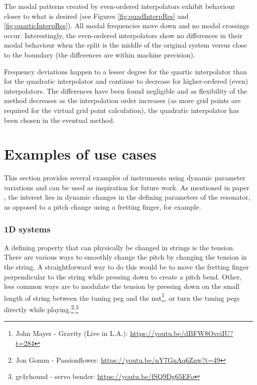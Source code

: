 The modal patterns created by even-ordered interpolators exhibit behaviour closer to what is desired (see Figures \ref{fig:quadInterpRes} and \ref{fig:quarticInterpRes}). All modal frequencies move down and no modal crossings occur. Interestingly, the even-ordered interpolators show no differences in their modal behaviour when the split is the middle of the original system versus close to the boundary (the differences are within machine precision).

Frequency deviations happen to a lesser degree for the quartic interpolator than for the quadratic interpolator and continue to decrease for higher-ordered (even) interpolators. The differences have been found negligible and as flexibility of the method decreases as the interpolation order increases (as more grid points are required for the virtual grid point calculation), the quadratic interpolator has been chosen in the eventual method. 


\section{Examples of use cases}\label{sec:examples}
This section provides several examples of instruments using dynamic parameter variations and can be used as inspiration for future work. As mentioned in paper \citeP[G], the interest lies in dynamic changes in the defining parameters of the resonator, as opposed to a pitch change using a fretting finger, for example. 


\subsubsection{1D systems}
A defining property that can physically be changed in strings is the tension. 
There are various ways to smoothly change the pitch by changing the tension in the string. A straightforward way to do this would be to move the fretting finger perpendicular to the string while pressing down to create a pitch bend. Other, less common ways are to modulate the tension by pressing down on the small length of string between the tuning peg and the nut\footnote{John Mayer - Gravity (Live in L.A.): \url{https://youtu.be/dBFW8OvciIU?t=284}}, or turn the tuning pegs directly while playing.\footnote{Jon Gomm - Passionflower: \url{https://youtu.be/nY7GnAq6Znw?t=49}}\textsuperscript{,}\footnote{gr4yhound - servo bender: \url{https://youtu.be/fSQ9Dg65EFo}}

